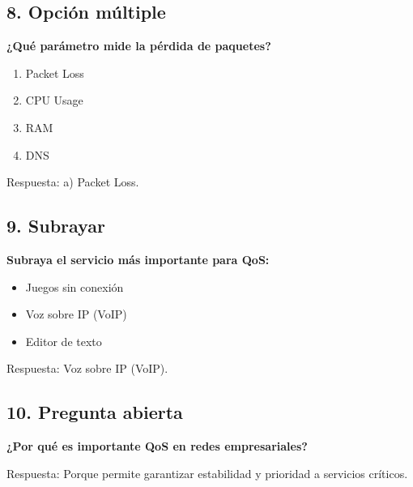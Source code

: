 \documentclass[12pt]{article}
\begin{document}
\vspace{0.5cm}

\subsection*{8. Opción múltiple}
\textbf{¿Qué parámetro mide la pérdida de paquetes?}

\begin{enumerate}[label=\alph*)]
    \item Packet Loss
    \item CPU Usage
    \item RAM
    \item DNS
\end{enumerate}

Respuesta: a) Packet Loss.

\vspace{0.5cm}

\subsection*{9. Subrayar}
\textbf{Subraya el servicio más importante para QoS:}

\begin{itemize}
    \item Juegos sin conexión
    \item Voz sobre IP (VoIP)
    \item Editor de texto
\end{itemize}

Respuesta: Voz sobre IP (VoIP).

\vspace{0.5cm}

\subsection*{10. Pregunta abierta}
\textbf{¿Por qué es importante QoS en redes empresariales?}

Respuesta: Porque permite garantizar estabilidad y prioridad a servicios críticos.
\end{document}

